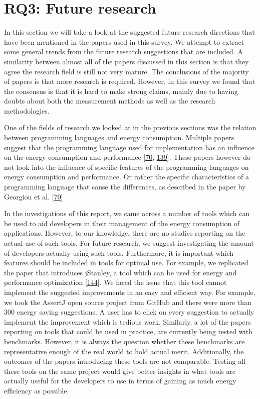 \documentclass[]{book}
\begin{document}
\section{RQ3: Future research}\label{rq3-future-research-1}

In this section we will take a look at the suggested future research
directions that have been mentioned in the papers used in this survey.
We attempt to extract some general trends from the future research
suggestions that are included. A similarity between almost all of the
papers discussed in this section is that they agree the research field
is still not very mature. The conclusions of the majority of papers is
that more research is required. However, in this survey we found that
the consensus is that it is hard to make strong claims, mainly due to
having doubts about both the measurement methods as well as the research
methodologies.

One of the fields of research we looked at in the previous sections was
the relation between programming languages and energy consumption.
Multiple papers suggest that the programming language used for
implementation has an influence on the energy consumption and
performance {[}\protect\hyperlink{ref-GKLS2018}{70},
\protect\hyperlink{ref-OOC2017}{139}{]}. These papers however do not
look into the influence of specific features of the programming
languages on energy consumption and performance. Or rather the specific
characteristics of a programming language that cause the differences, as
described in the paper by Georgiou et al.
{[}\protect\hyperlink{ref-GKLS2018}{70}{]}

In the investigations of this report, we came across a number of tools
which can be used to aid developers in their management of the energy
consumption of applications. However, to our knowledge, there are no
studies reporting on the actual use of such tools. For future research,
we suggest investigating the amount of developers actually using such
tools. Furthermore, it is important which features should be included in
tools for optimal use. For example, we replicated the paper that
introduces jStanley, a tool which can be used for energy and performance
optimization {[}\protect\hyperlink{ref-PSCS2018}{144}{]}. We faced the
issue that this tool cannot implement the suggested improvements in an
easy and efficient way. For example, we took the AssertJ open source
project from GitHub and there were more than 300 energy saving
suggestions. A user has to click on every suggestion to actually
implement the improvement which is tedious work. Similarly, a lot of the
papers reporting on tools that could be used in practice, are currently
being tested with benchmarks. However, it is always the question whether
these benchmarks are representative enough of the real world to hold
actual merit. Additionally, the outcomes of the papers introducing these
tools are not comparable. Testing all these tools on the same project
would give better insights in what tools are actually useful for the
developers to use in terms of gaining as much energy efficiency as
possible.
\end{document}
